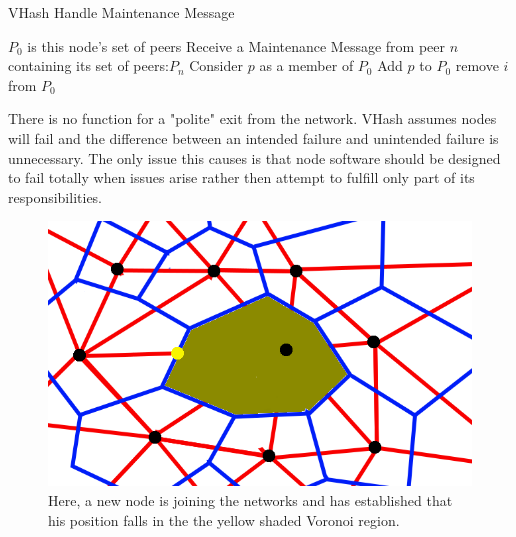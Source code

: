 \documentclass{IEEEtran}
\begin{document}
\begin{algorithm}
\caption{VHash Handle Maintenance Message}
\label{handlemaint}
\begin{algorithmic}[1]  %
	\STATE $P_0$ is this node's set of peers
	\STATE Receive a Maintenance Message from peer $n$ containing its set of peers:$P_n$
    	\STATE Consider $p$ as a member of $P_0$
        	\STATE Add $p$ to $P_0$
                	\STATE remove $i$ from $P_0$
                \ENDIF
            \ENDFOR
        \ENDIF
    \ENDFOR
\end{algorithmic}
\end{algorithm}

There is no function for a "polite" exit from the network. VHash  assumes nodes will fail and the difference between an intended failure and unintended failure is unnecessary. The only issue this causes is that node software should be designed to fail totally when issues arise rather then attempt to fulfill only part of its responsibilities.  


\begin{figure}
    \includegraphics[width=\linewidth]{voronoi-churn4}
    \caption{Here, a new node is joining the networks and has established that his position falls in the the yellow shaded Voronoi region.}
    \label{churnjoin}
\end{figure}
\end{document}
